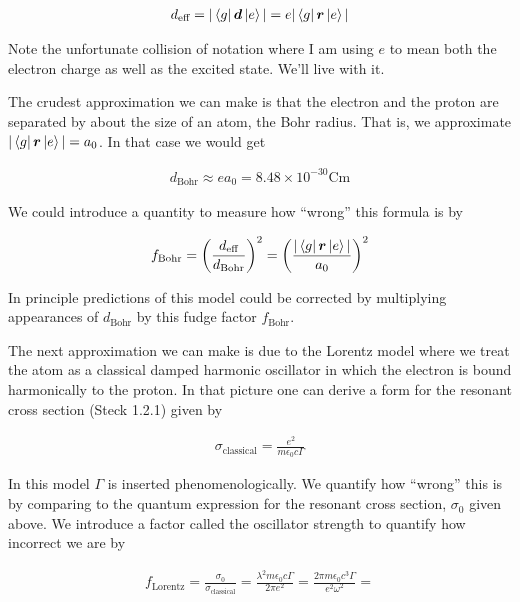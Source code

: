 \documentclass[12pt]{article}
\newcommand{\bv}[1]{\boldsymbol{#1}}
\begin{document}
\begin{align}
d_{\text{eff}} = |\bra{g} \bv{d} \ket{e}| =  e|\bra{g} \bv{r} \ket{e}|
\end{align}

Note the unfortunate collision of notation where I am using $e$ to mean both the electron charge as well as the excited state. We'll live with it.

The crudest approximation we can make is that the electron and the proton are separated by about the size of an atom, the Bohr radius. That is, we approximate $|\bra{g} \bv{r} \ket{e}|=a_0$. In that case we would get

\begin{align}
d_{\text{Bohr}} \approx e a_0 = 8.48 \times 10^{-30} \text{Cm}
\end{align}

We could introduce a quantity to measure how ``wrong'' this formula is by

\begin{align}
f_{\text{Bohr}} = \left(\frac{d_{\text{eff}}}{d_{\text{Bohr}}}\right)^2 = \left(\frac{|\bra{g} \bv{r} \ket{e}|}{a_0}\right)^2
\end{align} 

In principle predictions of this model could be corrected by multiplying appearances of $d_{\text{Bohr}}$ by this fudge factor $f_{\text{Bohr}}$.

The next approximation we can make is due to the Lorentz model where we treat the atom as a classical damped harmonic oscillator in which the electron is bound harmonically to the proton. In that picture one can derive a form for the resonant cross section (Steck 1.2.1) given by

\begin{align}
\sigma_{\text{classical}} = \frac{e^2}{m\epsilon_0 c \Gamma}
\end{align}

In this model $\Gamma$ is inserted phenomenologically. We quantify how ``wrong'' this is by comparing to the quantum expression for the resonant cross section, $\sigma_0$ given above. We introduce a factor called the oscillator strength to quantify how incorrect we are by

\begin{align}
f_{\text{Lorentz}} = \frac{\sigma_0}{\sigma_{\text{classical}}} = \frac{\lambda^2 m \epsilon_0 c \Gamma}{2 \pi e^2} = \frac{2\pi m \epsilon_0 c^3 \Gamma}{e^2 \omega^2} = 
\end{align}
\end{document}

